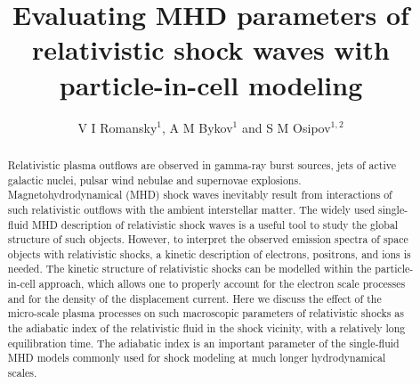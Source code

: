 \documentclass[a4paper]{jpconf}
\begin{document}
	\title{Evaluating MHD parameters of relativistic shock waves with particle-in-cell modeling}
	
	\author{V I Romansky$^{1}$, A M Bykov$^{1}$ and S M Osipov$^{1,2}$}
	
\address{$^1$ Ioffe Institute, 26 Politekhnicheskaya st., St. Petersburg 194021, Russia}
\address{$^2$ Peter the Great St. Petersburg Polytechnic University, 29 Politekhnicheskaya st., St. Petersburg 195251, Russia}
	
	
	\begin{abstract}
		Relativistic plasma outflows are observed in gamma-ray burst 
		sources, jets of active galactic nuclei, pulsar wind nebulae and
		supernovae explosions. Magnetohydrodynamical (MHD) shock waves
		inevitably result from interactions of such relativistic outflows with
		the ambient interstellar matter. The widely used single-fluid MHD
		description of relativistic shock waves is a useful tool to study the
		global structure of such objects. However, to interpret the observed
		emission spectra of space objects with relativistic shocks, a kinetic
		description of electrons, positrons, and ions is needed. The kinetic
		structure of relativistic shocks can be modelled within the
		particle-in-cell approach, which allows one to properly account for
		the electron scale processes and for the density of the displacement
		current. Here we discuss the effect of the micro-scale plasma processes on such
		macroscopic parameters of relativistic shocks as the adiabatic index
		of the relativistic fluid in the shock vicinity, with a relatively
		long equilibration time. The adiabatic index is an important parameter of the
		single-fluid MHD models commonly used for shock modeling at much
		longer hydrodynamical scales.
	\end{abstract}
	
\end{document}
